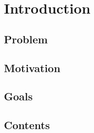 \chapter{Introduction}
\label{chap:introduction}

\section{Problem}

\section{Motivation}

\section{Goals}

\section{Contents}
